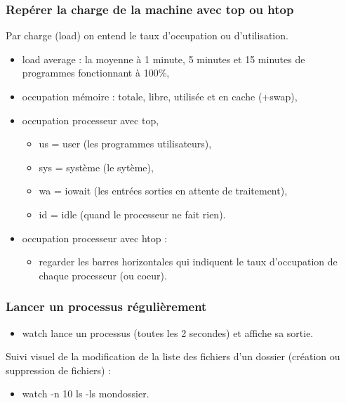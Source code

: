 \documentclass[handout,10pt]{beamer}
\begin{document}
\frame
{
    \frametitle{Repérer la charge de la machine avec top ou htop}

    Par charge (load) on entend le taux d'occupation ou d'utilisation.

    \begin{itemize}
        \item load average : la moyenne à 1 minute, 5 minutes et 15 minutes de programmes fonctionnant à 100\%,
        \item occupation mémoire : totale, libre, utilisée et en cache (+swap),
        \item occupation processeur avec top,
        \begin{itemize}
            \item us = user (les programmes utilisateurs),
            \item sys = système (le sytème),
            \item wa = iowait (les entrées sorties en attente de traitement),
            \item id = idle (quand le processeur ne fait rien).
        \end{itemize}
        \item occupation processeur avec htop :
        \begin{itemize}
            \item regarder les barres horizontales qui indiquent le taux d'occupation de chaque processeur (ou coeur).
        \end{itemize}
    \end{itemize}
}


\frame
{
    \frametitle{Lancer un processus régulièrement}

    \begin{itemize}
        \item {\ttfamily watch} lance un processus (toutes les 2 secondes) et affiche sa sortie.
    \end{itemize}

    Suivi visuel de la modification de la liste des fichiers d'un dossier (création ou suppression de fichiers) :

    \begin{itemize}
        \item {\ttfamily watch -n 10 ls -ls mondossier}.
    \end{itemize}
}
\end{document}
